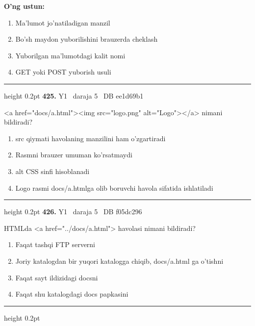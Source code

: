 \documentclass[10pt,a4paper,oneside]{article}
\begin{document}
\textbf{\footnotesize O'ng ustun:}
\begin{enumerate}[label=\Alph*),leftmargin=9mm]
\item Ma'lumot jo'natiladigan manzil
\item Bo'sh maydon yuborilishini brauzerda cheklash
\item Yuborilgan ma'lumotdagi kalit nomi
\item GET yoki POST yuborish usuli
\end{enumerate}
\vspace{2mm}\hrule height 0.2pt \vspace{4mm}
\hypertarget{q425}{\textbf{\color{ink}425.}}  {\color{muted}\scriptsize Y1 \textbullet\ daraja 5 \textbullet\ DB ee1d69b1}
\par
\textless{}a href="docs/a.html"\textgreater{}\textless{}img src="logo.png" alt="Logo"\textgreater{}\textless{}/a\textgreater{} nimani bildiradi?
\begin{enumerate}[label=\Alph*),leftmargin=9mm]
\item src qiymati havolaning manzilini ham o'zgartiradi
\item Rasmni brauzer umuman ko'rsatmaydi
\item alt CSS sinfi hisoblanadi
\item Logo rasmi docs/a.htmlga olib boruvchi havola sifatida ishlatiladi
\end{enumerate}
\vspace{2mm}\hrule height 0.2pt \vspace{4mm}
\hypertarget{q426}{\textbf{\color{ink}426.}}  {\color{muted}\scriptsize Y1 \textbullet\ daraja 5 \textbullet\ DB f05dc296}
\par
HTMLda \textless{}a href="../docs/a.html"\textgreater{} havolasi nimani bildiradi?
\begin{enumerate}[label=\Alph*),leftmargin=9mm]
\item Faqat tashqi FTP serverni
\item Joriy katalogdan bir yuqori katalogga chiqib, docs/a.html ga o'tishni
\item Faqat sayt ildizidagi docsni
\item Faqat shu katalogdagi docs papkasini
\end{enumerate}
\vspace{2mm}\hrule height 0.2pt \vspace{4mm}
\end{document}
